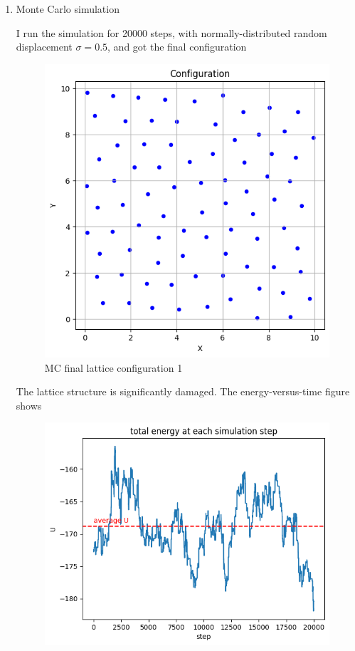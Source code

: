 \documentclass[letterpaper,12pt]{article}
\numberwithin{equation}{section}
\begin{document}
\begin{enumerate}[label=(\alph*)]
    \item Monte Carlo simulation
    
    I run the simulation for 20000 steps, with normally-distributed random displacement $\sigma=0.5$, and got the final configuration 
    \begin{figure}[H]
        \centering
        \includegraphics{Project/final_config_lattice_mc1.png}
        \caption{MC final lattice configuration 1}
        \label{fig:final_config_lattice_mc1}
    \end{figure}
    The lattice structure is significantly damaged. The energy-versus-time figure shows
    \begin{figure}[H]
        \centering
        \includegraphics{Project/energy_to_time_lattice_mc1.png}

\end{figure}
\end{enumerate}
\end{document}
